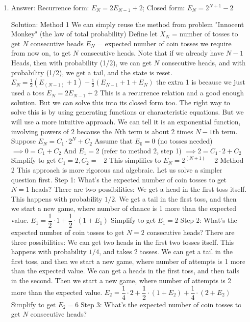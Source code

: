\begin{enumerate}

\item
Answer: Recurrence form: $E_N = 2E_{N-1} + 2$;
Closed form: $E_N = 2^{N+1}-2$
 
Solution: Method 1
We can simply reuse the method from problem "Innocent Monkey" (the law of total probability)
Define let $X_N$ = number of tosses to get $N$ consecutive heads
$E_N$ = expected number of coin tosses we require from now on, to get $N$ consecutive heads.
Note that if we already have $N-1$ Heads, then with probability (1/2), we can get $N$ consecutive heads, and with probability (1/2), we get a tail, and the state is reset.
$E_N =  \frac{1}{2}( E_{(N-1)} + 1) + \frac{1}{2}(E_{N-1} + 1 + E_N)$
the extra 1 is because we just used a toss
$E_N = 2E_{N-1} + 2$
This is a recurrence relation and a good enough solution. But we can solve this into its closed form too.
The right way to solve this is by using generating functions or characteristic equations.
But we will use a more intuitive approach.
We can tell it is an exponential function, involving powers of $2$ because the $N$th term is about 2 times $N-1$th term. Suppose $E_N = C_1 \cdot 2^{N} + C_2$
Assume that $E_0 = 0$ (no tosses needed) $\implies 0 = C_1 + C_2$
And $E_1 = 2$ (refer to method 2, step 1) $\implies 2 = C_1\cdot 2 + C_2$
Simplify to get $C_1 =2, C_2 = -2$
This simplifies to $E_N = 2^{(N+1)}-2$
Method 2
This approach is more rigorous and algebraic.
Let us solve a simpler question first.
Step 1: What's the expected number of coin tosses to get $N=1$ heads?
There are two possibilities:
We get a head in the first toss itself. This happens with probability $1/2$.
We get a tail in the first toss, and then we start a new game, where number of chance is 1 more than the expected value.
$E_1 = \dfrac{1}{2} \cdot 1 + \dfrac{1}{2} \cdot (1 + E_1)$
Simplify to get $E_1 = 2$
Step 2: What's the expected number of coin tosses to get $N=2$ consecutive heads?
There are three possibilities:
We can get two heads in the first two tosses itself. This happens with probability $1/4$, and takes 2 tosses.
We can get a tail in the first toss, and then we start a new game, where number of attempts is 1 more than the expected value.
We can get a heads in the first toss, and then tails in the second. Then we start a new game, where number of attempts is 2 more than the expected value.
$E_2 = \dfrac{1}{4} \cdot 2 + \dfrac{1}{2} \cdot (1 + E_2) + \dfrac{1}{4} \cdot (2 + E_2)$
Simplify to get $E_2 = 6$
Step 3: What's the expected number of coin tosses to get $N$ consecutive heads?

\end{enumerate}

